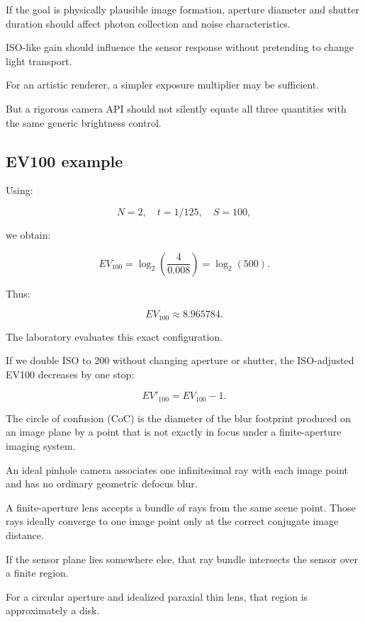\hypertarget{02-foundations-ii-ch036-why-physically-based-renderers-must-distinguish-exposure-from-gain}{}

If the goal is physically plausible image formation, aperture diameter and shutter duration should affect photon collection and noise characteristics.

ISO-like gain should influence the sensor response without pretending to change light transport.

For an artistic renderer, a simpler exposure multiplier may be sufficient.

But a rigorous camera API should not silently equate all three quantities with the same generic brightness control.

\subsection{EV100 example}\label{02-foundations-ii-ch036-ev100-example}

\hypertarget{02-foundations-ii-ch036-ev100-example}{}

Using:

\[ N=2,\quad t=1/125,\quad S=100, \]

we obtain:

\[ EV_{100} = \log_2\left(\frac4{0.008}\right) = \log_2(500). \]

Thus:

\[ \boxed{EV_{100}\approx8.965784}. \]

The laboratory evaluates this exact configuration.

If we double ISO to 200 without changing aperture or shutter, the ISO-adjusted EV100 decreases by one stop:

\[ \boxed{ EV'_{100}=EV_{100}-1. } \]

The circle of confusion (CoC) is the diameter of the blur footprint produced on an image plane by a point that is not exactly in focus under a finite-aperture imaging system.

An ideal pinhole camera associates one infinitesimal ray with each image point and has no ordinary geometric defocus blur.

A finite-aperture lens accepts a bundle of rays from the same scene point. Those rays ideally converge to one image point only at the correct conjugate image distance.

If the sensor plane lies somewhere else, that ray bundle intersects the sensor over a finite region.

For a circular aperture and idealized paraxial thin lens, that region is approximately a disk.

